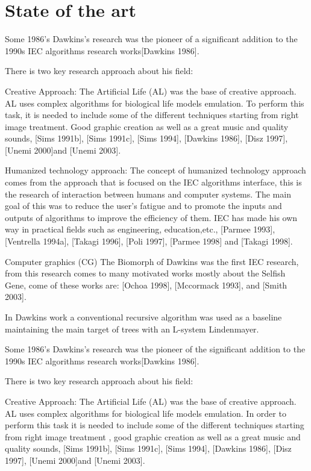 \chapter{State of the art} \label{}


Some 1986's Dawkins's research was the pioneer of a significant addition to the
1990s IEC algorithms research works\cite{}[Dawkins 1986].

There is two key research approach about his field:

Creative Approach: The Artificial Life (AL) was the base of creative approach.
AL uses complex algorithms for biological life models emulation. To perform this
task, it is needed to include some of the different techniques starting from
right image treatment. Good graphic creation as well as a great music and
quality sounds, [Sims 1991b], [Sims 1991c], [Sims 1994], [Dawkins 1986], [Disz
1997], [Unemi 2000]and [Unemi 2003].
 
Humanized technology approach: The concept of humanized technology approach
comes from the approach that is focused on the IEC algorithms interface, this is
the research of interaction between humans and computer systems. The main goal
of this was to reduce the user's fatigue and to promote the inputs and outputs
of algorithms to improve the efficiency of them. IEC has made his own way in
practical fields such as engineering, education,etc., [Parmee 1993], [Ventrella
1994a], [Takagi 1996], [Poli 1997], [Parmee 1998] and [Takagi 1998].

Computer graphics (CG) The Biomorph of Dawkins was the first IEC research, from
this research comes to many motivated works mostly about the Selfish Gene, come
of these works are:  [Ochoa 1998], [Mccormack 1993], and [Smith 2003].

In Dawkins work a conventional recursive algorithm was used as a baseline
maintaining the main target of trees with an L-system Lindenmayer.

Some 1986's Dawkins's research was the pioneer of the significant addition to
the 1990s IEC algorithms research works[Dawkins 1986].

There is two key research approach about his field:

Creative Approach: The Artificial Life (AL) was the base of creative approach.
AL uses complex algorithms for biological life models emulation. In order to
perform this task it is needed to include some of the different techniques
starting from right image treatment , good graphic creation as well as a great
music and quality sounds, [Sims 1991b], [Sims 1991c], [Sims 1994], [Dawkins
1986], [Disz 1997], [Unemi 2000]and [Unemi 2003].
 
